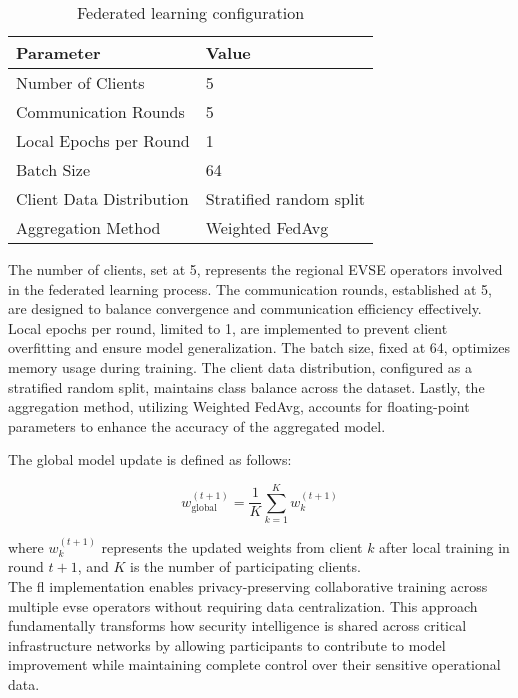 \begin{table}[h]
	\centering
	\renewcommand{\arraystretch}{1.4} %
	\setlength{\tabcolsep}{12pt}      %
	\caption{Federated learning configuration}
	\label{tab:fedlearn_config}
	\begin{tabular}{ll}
		\toprule
		\textbf{Parameter} & \textbf{Value} \\
		\midrule
		Number of Clients & 5 \\
		Communication Rounds & 5 \\
		Local Epochs per Round & 1 \\
		Batch Size & 64 \\
		Client Data Distribution & Stratified random split \\
		Aggregation Method & Weighted FedAvg \\
		\bottomrule
	\end{tabular}
\end{table}

The number of clients, set at 5, represents the regional EVSE operators involved in the federated learning process. The communication rounds, established at 5, are designed to balance convergence and communication efficiency effectively. Local epochs per round, limited to 1, are implemented to prevent client overfitting and ensure model generalization. The batch size, fixed at 64, optimizes memory usage during training. The client data distribution, configured as a stratified random split, maintains class balance across the dataset. Lastly, the aggregation method, utilizing Weighted FedAvg, accounts for floating-point parameters to enhance the accuracy of the aggregated model.

The global model update is defined as follows:

\begin{equation}
	w_{\text{global}}^{(t+1)} = \frac{1}{K} \sum_{k=1}^{K} w_k^{(t+1)}
\end{equation}

where \( w_k^{(t+1)} \) represents the updated weights from client \( k \) after local training in round \( t+1 \), and \( K \) is the number of participating clients. \\

The \acrlong{fl} implementation enables privacy-preserving collaborative training across multiple \gls{evse} operators without requiring data centralization. This approach fundamentally transforms how security intelligence is shared across critical infrastructure networks by allowing participants to contribute to model improvement while maintaining complete control over their sensitive operational data. \\

